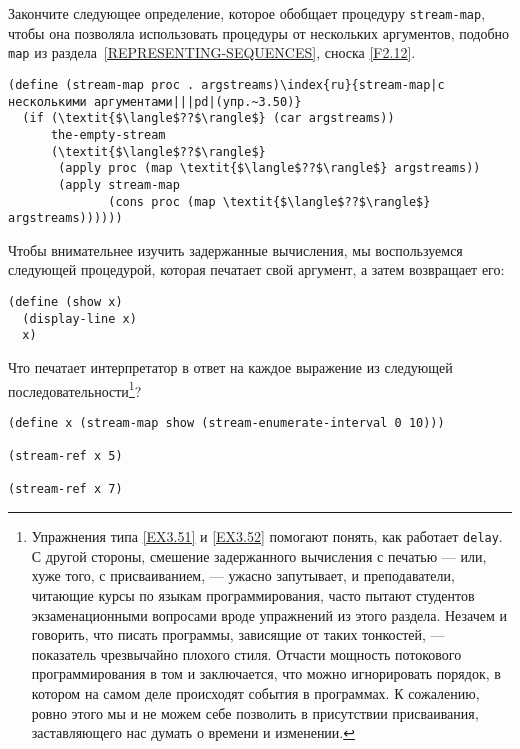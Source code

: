 \begin{exercise}{3.50}\label{EX3.50}%
Закончите следующее определение, которое обобщает
процедуру {\tt stream-map}, чтобы она позволяла использовать
процедуры от нескольких аргументов, подобно {\tt map} из
раздела~\ref{REPRESENTING-SEQUENCES}, сноска
\ref{F2.12}.

\begin{Verbatim}[fontsize=\small]
(define (stream-map proc . argstreams)\index{ru}{stream-map|с несколькими аргументами|||pd|(упр.~3.50)}
  (if (\textit{$\langle$??$\rangle$} (car argstreams))
      the-empty-stream
      (\textit{$\langle$??$\rangle$}
       (apply proc (map \textit{$\langle$??$\rangle$} argstreams))
       (apply stream-map
              (cons proc (map \textit{$\langle$??$\rangle$} argstreams))))))
\end{Verbatim}

\end{exercise}
\begin{exercise}{3.51}\label{EX3.51}%
Чтобы внимательнее изучить задержанные вычисления, мы
воспользуемся следующей процедурой, которая печатает свой аргумент, а
затем возвращает его:

\begin{Verbatim}[fontsize=\small]
(define (show x)
  (display-line x)
  x)
\end{Verbatim}
Что печатает интерпретатор в ответ на каждое выражение из следующей
последовательности\footnote{Упражнения типа \ref{EX3.51} и
\ref{EX3.52} помогают понять, как работает
{\tt delay}.  С другой стороны, смешение задержанного
вычисления с печатью --- или, хуже того, с присваиванием, ---
ужасно запутывает, и преподаватели, читающие курсы по языкам
программирования, часто пытают студентов экзаменационными вопросами
вроде упражнений из этого раздела.  Незачем и говорить, что
писать
программы, зависящие от таких тонкостей, --- показатель чрезвычайно
плохого стиля.
Отчасти мощность потокового программирования в том и заключается, что
можно игнорировать порядок, в котором на самом деле происходят события
в программах.  К сожалению, ровно этого мы и не можем себе позволить в
присутствии присваивания, заставляющего нас думать о времени и
изменении.}?

\begin{Verbatim}[fontsize=\small]
(define x (stream-map show (stream-enumerate-interval 0 10)))

(stream-ref x 5)

(stream-ref x 7)
\end{Verbatim}

\end{exercise}
